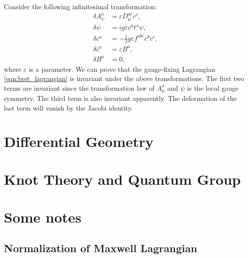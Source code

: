 \documentclass[a4paper,pdftex]{report}
\begin{document}
Consider the following infinitesimal transformation:
\begin{align}
  \delta A_{\psi}^{a}
  &=
  \varepsilon D_{\mu}^{ac}c^{c}
  ,
  \\
  \delta\psi
  &=
  ig\varepsilon c^{a}t^{a}\psi
  ,
  \\
  \delta c^{a}
  &=
  -
  \frac{1}{2}g\varepsilon f^{abc}c^{b}c^{c}
  ,
  \\
  \delta \bar{c}^{a}
  &=
  \varepsilon B^{a}
  ,
  \\
  \delta B^{a}
  &=
  0
  ,
\end{align}
where $\varepsilon$ is a parameter. We can prove that the gauge-fixing Lagrangian \eqref{eqn:brst_lagrangian} is invariant under the above transformations. The first two terms are invariant since the transformation law of $A_{\mu}^{a}$ and $\psi$ is the local gauge symmetry. The third term is also invariant apparently. The deformation of the last term will vanish by the Jacobi identity.














  

\clearpage
\chapter{Differential Geometry}











\clearpage
\chapter{Knot Theory and Quantum Group}











\clearpage
\appendix
\chapter{Some notes}

\section{Normalization of Maxwell Lagrangian}
\end{document}
